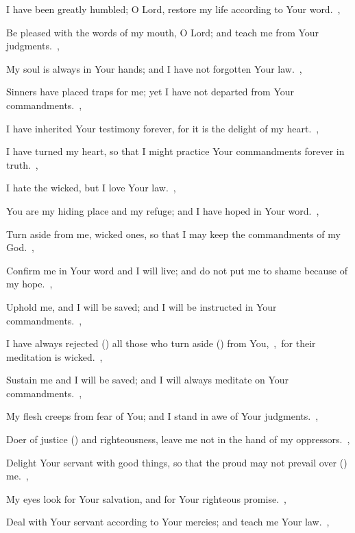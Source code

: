 \documentclass[12pt,twoside,a5paper]{article}
\begin{document}
\begin{normalparskip}
  I have been greatly humbled; O Lord, restore my life according to Your word.~\sep

  Be pleased with the words of my mouth, O Lord; and teach me from Your judgments.~\sep

  My soul is always in Your hands; and I have not forgotten Your law.~\sep

  Sinners have placed traps for me; yet I have not departed from Your commandments.~\sep

  I have inherited Your testimony forever, for it is the delight of my heart.~\sep

  I have turned my heart, so that I might practice Your commandments forever in truth.~\sep

   I hate the wicked, but I love Your law.~\sep


  You are my hiding place and my refuge; and I have hoped in Your word.~\sep

  Turn aside from me, wicked ones, so that I may keep the commandments of my God.~\sep

  Confirm me in Your word and I will live; and do not put me to shame because of my hope.~\sep

  Uphold me, and I will be saved; and I will be instructed in Your commandments.~\sep

  I have always rejected () all those who turn aside () from You,~\sep\ for their meditation is wicked.~\sep

  Sustain me and I will be saved; and I will always meditate on Your commandments.~\sep

  My flesh creeps from fear of You; and I stand in awe of Your judgments.~\sep

   Doer of justice () and righteousness, leave me not in the hand of my oppressors.~\sep


  Delight Your servant with good things, so that the proud may not prevail over () me.~\sep

  My eyes look for Your salvation, and for Your righteous promise.~\sep

  Deal with Your servant according to Your mercies; and teach me Your law.~\sep


\end{normalparskip}
\end{document}
